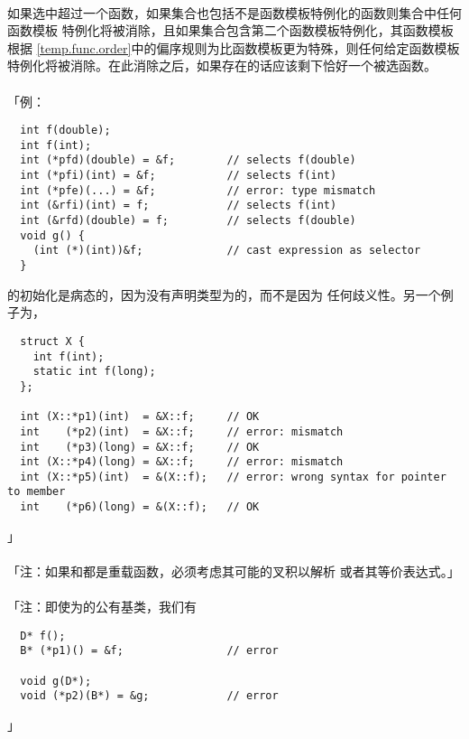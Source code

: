 \paragraph{}
如果选中超过一个函数，如果集合也包括不是函数模板特例化的函数则集合中任何函数模板
特例化将被消除，且如果集合包含第二个函数模板特例化，其函数模板根据
\ref{temp.func.order}中的偏序规则为比函数模板更为特殊，则任何给定函数模板
特例化将被消除。在此消除之后，如果存在的话应该剩下恰好一个被选函数。

\paragraph{}
「例：
\begin{lstlisting}
  int f(double);
  int f(int);
  int (*pfd)(double) = &f;        // selects f(double)
  int (*pfi)(int) = &f;           // selects f(int)
  int (*pfe)(...) = &f;           // error: type mismatch
  int (&rfi)(int) = f;            // selects f(int)
  int (&rfd)(double) = f;         // selects f(double)
  void g() {
    (int (*)(int))&f;             // cast expression as selector
  }
\end{lstlisting}
的初始化是病态的，因为没有声明类型为的，而不是因为
任何歧义性。另一个例子为，
\begin{lstlisting}
  struct X {
    int f(int);
    static int f(long);
  };

  int (X::*p1)(int)  = &X::f;     // OK
  int    (*p2)(int)  = &X::f;     // error: mismatch
  int    (*p3)(long) = &X::f;     // OK
  int (X::*p4)(long) = &X::f;     // error: mismatch
  int (X::*p5)(int)  = &(X::f);   // error: wrong syntax for pointer to member
  int    (*p6)(long) = &(X::f);   // OK
\end{lstlisting}」

\paragraph{}
「注：如果和都是重载函数，必须考虑其可能的叉积以解析
或者其等价表达式。」

\paragraph{}
「注：即使为的公有基类，我们有
\begin{lstlisting}
  D* f();
  B* (*p1)() = &f;                // error

  void g(D*);
  void (*p2)(B*) = &g;            // error
\end{lstlisting}」

